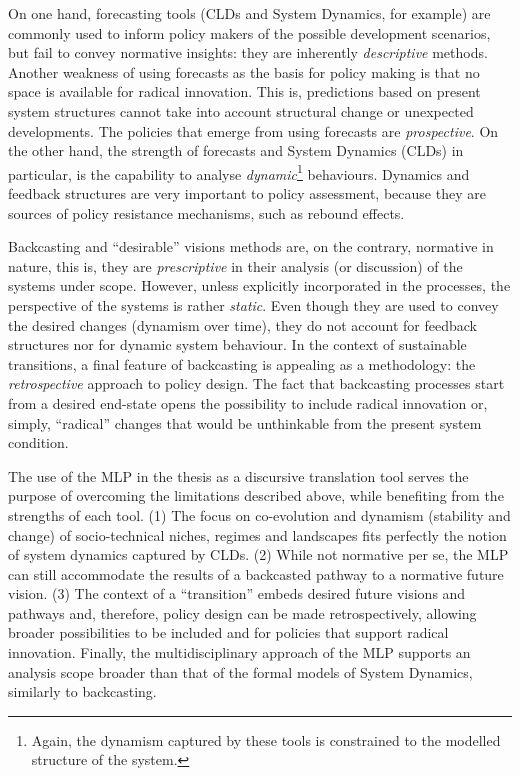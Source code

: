 On one hand, forecasting tools (CLDs and System Dynamics, for example) are commonly used to inform policy makers of the possible development scenarios, but fail to convey normative insights: they are inherently \emph{descriptive} methods. Another weakness of using forecasts as the basis for policy making is that no space is available for radical innovation. This is, predictions based on present system structures cannot take into account structural change or unexpected developments. The policies that emerge from using forecasts are \emph{prospective}. On the other hand, the strength of forecasts and System Dynamics (CLDs) in particular, is the capability to analyse \emph{dynamic}\footnote{Again, the dynamism captured by these tools is constrained to the modelled structure of the system.} behaviours. Dynamics and feedback structures are very important to policy assessment, because they are sources of policy resistance mechanisms, such as rebound effects.

Backcasting and ``desirable'' visions methods are, on the contrary, normative in nature, this is, they are \emph{prescriptive} in their analysis (or discussion) of the systems under scope. However, unless explicitly incorporated in the processes, the perspective of the systems is rather \emph{static}. Even though they are used to convey the desired changes (dynamism over time), they do not account for feedback structures nor for dynamic system behaviour. In the context of sustainable transitions, a final feature of backcasting is appealing as a methodology: the \emph{retrospective} approach to policy design. The fact that backcasting processes start from a desired end-state opens the possibility to include radical innovation or, simply, ``radical'' changes that would be unthinkable from the present system condition.

The use of the MLP in the thesis as a discursive translation tool serves the purpose of overcoming the limitations described above, while benefiting from the strengths of each tool. (1) The focus on co-evolution and dynamism (stability and change) of socio-technical niches, regimes and landscapes fits perfectly the notion of system dynamics captured by CLDs. (2) While not normative per se, the MLP can still accommodate the results of a backcasted pathway to a normative future vision. (3) The context of a ``transition'' embeds desired future visions and pathways and, therefore, policy design can be made retrospectively, allowing broader possibilities to be included and for policies that support radical innovation. Finally, the multidisciplinary approach of the MLP supports an analysis scope broader than that of the formal models of System Dynamics, similarly to backcasting.

